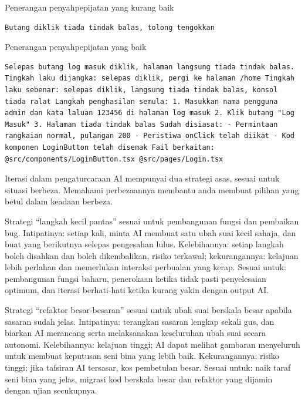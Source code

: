 Penerangan penyahpepijatan yang kurang baik

\begin{lstlisting}
Butang diklik tiada tindak balas, tolong tengokkan
\end{lstlisting}

Penerangan penyahpepijatan yang baik

\begin{lstlisting}
Selepas butang log masuk diklik, halaman langsung tiada tindak balas. Tingkah laku dijangka: selepas diklik, pergi ke halaman /home Tingkah laku sebenar: selepas diklik, langsung tiada tindak balas, konsol tiada ralat Langkah penghasilan semula: 1. Masukkan nama pengguna admin dan kata laluan 123456 di halaman log masuk 2. Klik butang "Log Masuk" 3. Halaman tiada tindak balas Sudah disiasat: - Permintaan rangkaian normal, pulangan 200 - Peristiwa onClick telah diikat - Kod komponen LoginButton telah disemak Fail berkaitan: @src/components/LoginButton.tsx @src/pages/Login.tsx
\end{lstlisting}


Iterasi dalam pengaturcaraan AI mempunyai dua strategi asas, sesuai untuk situasi berbeza. Memahami perbezaannya membantu anda membuat pilihan yang betul dalam keadaan berbeza.

Strategi “langkah kecil pantas” sesuai untuk pembangunan fungsi dan pembaikan bug. Intipatinya: setiap kali, minta AI membuat satu ubah suai kecil sahaja, dan buat yang berikutnya selepas pengesahan lulus. Kelebihannya: setiap langkah boleh disahkan dan boleh dikembalikan, risiko terkawal; kekurangannya: kelajuan lebih perlahan dan memerlukan interaksi perbualan yang kerap. Sesuai untuk: pembangunan fungsi baharu, penerokaan ketika tidak pasti penyelesaian optimum, dan iterasi berhati-hati ketika kurang yakin dengan output AI.

Strategi “refaktor besar-besaran” sesuai untuk ubah suai berskala besar apabila sasaran sudah jelas. Intipatinya: terangkan sasaran lengkap sekali gus, dan biarkan AI merancang serta melaksanakan keseluruhan ubah suai secara autonomi. Kelebihannya: kelajuan tinggi; AI dapat melihat gambaran menyeluruh untuk membuat keputusan seni bina yang lebih baik. Kekurangannya: risiko tinggi; jika tafsiran AI tersasar, kos pembetulan besar. Sesuai untuk: naik taraf seni bina yang jelas, migrasi kod berskala besar dan refaktor yang dijamin dengan ujian secukupnya.


